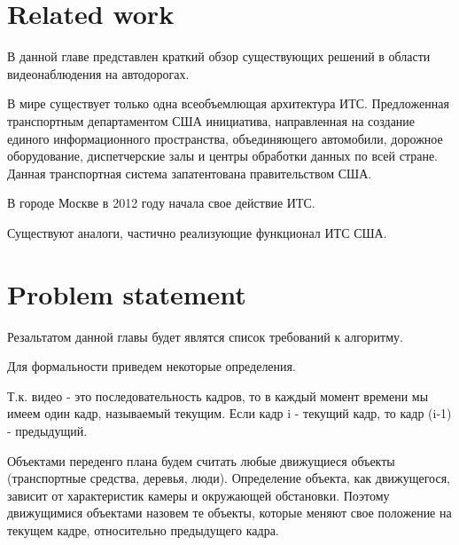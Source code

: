 \documentclass[12pt,a4paper,oneside,titlepage]{article}
\begin{document}
\newpage
\section*{Related work}
В данной главе представлен краткий обзор существующих решений в области видеонаблюдения на автодорогах.

В мире существует только одна всеобъемлющая архитектура ИТС. Предложенная транспортным департаментом США инициатива, направленная на создание единого информационного пространства, объединяющего автомобили, дорожное оборудование, диспетчерские залы и центры обработки данных по всей стране. Данная транспортная система запатентована правительством США.

В городе Москве в 2012 году начала свое действие ИТС.

Существуют аналоги, частично реализующие функционал ИТС США.






























\newpage
\section*{Problem statement}
Резальтатом данной главы будет являтся список требований к алгоритму.

Для формальности приведем некоторые определения.

Т.к. видео - это последовательность кадров, то в каждый момент времени мы имеем один кадр, называемый текущим.
Если кадр i - текущий кадр, то кадр (i-1) - предыдущий.

Объектами переденго плана будем считать любые движущиеся объекты (транспортные средства, деревья, люди).
Определение объекта, как движущегося, зависит от характеристик камеры и окружающей обстановки.
Поэтому движущимися объектами назовем те объекты, которые меняют свое положение на текущем кадре, относительно предыдущего кадра.
\end{document}
